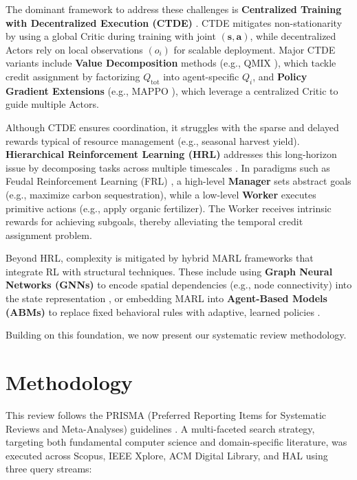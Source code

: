 \documentclass[conference]{IEEEtran}
\begin{document}
The dominant framework to address these challenges is \textbf{Centralized Training with Decentralized Execution (CTDE)} \cite{loweMultiAgentActorCriticMixed2020}. CTDE mitigates non-stationarity by using a global Critic during training with joint $(\mathbf{s}, \mathbf{a})$, while decentralized Actors rely on local observations $(o_i)$ for scalable deployment. Major CTDE variants include \textbf{Value Decomposition} methods (e.g., QMIX \cite{rashidQMIXMonotonicValue2018a}), which tackle credit assignment by factorizing $Q_{\text{tot}}$ into agent-specific $Q_i$, and \textbf{Policy Gradient Extensions} (e.g., MAPPO \cite{yuSurprisingEffectivenessPPO2022}), which leverage a centralized Critic to guide multiple Actors.

Although CTDE ensures coordination, it struggles with the sparse and delayed rewards typical of resource management (e.g., seasonal harvest yield). \textbf{Hierarchical Reinforcement Learning (HRL)} addresses this long-horizon issue by decomposing tasks across multiple timescales \cite{suttonMDPsSemiMDPsFramework1999}. In paradigms such as Feudal Reinforcement Learning (FRL) \cite{dayanFeudalReinforcementLearning1992}, a high-level \textbf{Manager} sets abstract goals (e.g., maximize carbon sequestration), while a low-level \textbf{Worker} executes primitive actions (e.g., apply organic fertilizer). The Worker receives intrinsic rewards for achieving subgoals, thereby alleviating the temporal credit assignment problem.

Beyond HRL, complexity is mitigated by hybrid MARL frameworks that integrate RL with structural techniques. These include using \textbf{Graph Neural Networks (GNNs)} to encode spatial dependencies (e.g., node connectivity) into the state representation \cite{10.1145/3580305.3599839}, or embedding MARL into \textbf{Agent-Based Models (ABMs)} to replace fixed behavioral rules with adaptive, learned policies \cite{sertSegregationDynamicsReinforcement2020}.

Building on this foundation, we now present our systematic review methodology.

\section{Methodology}
\label{methodology}

This review follows the PRISMA (Preferred Reporting Items for Systematic Reviews and Meta-Analyses) guidelines \cite{haddawayPRISMA2020PackageShiny2022}. A multi-faceted search strategy, targeting both fundamental computer science and domain-specific literature, was executed across Scopus, IEEE Xplore, ACM Digital Library, and HAL using three query streams:
\end{document}
